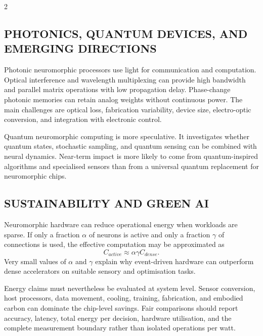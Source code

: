 \begin{multicols}{2}
  \subsection*{\centering\uppercase{Photonics, Quantum Devices, and Emerging Directions}}
  Photonic neuromorphic processors use light for communication and computation. Optical interference and wavelength multiplexing can provide high bandwidth and parallel matrix operations with low propagation delay. Phase-change photonic memories can retain analog weights without continuous power. The main challenges are optical loss, fabrication variability, device size, electro-optic conversion, and integration with electronic control.

  \noindent
  Quantum neuromorphic computing is more speculative. It investigates whether quantum states, stochastic sampling, and quantum sensing can be combined with neural dynamics. Near-term impact is more likely to come from quantum-inspired algorithms and specialised sensors than from a universal quantum replacement for neuromorphic chips.

  \subsection*{\centering\uppercase{Sustainability and Green AI}}
  Neuromorphic hardware can reduce operational energy when workloads are sparse. If only a fraction $\alpha$ of neurons is active and only a fraction $\gamma$ of connections is used, the effective computation may be approximated as
  \[
    C_{active}\approx\alpha\gamma C_{dense}.
  \]
  Very small values of $\alpha$ and $\gamma$ explain why event-driven hardware can outperform dense accelerators on suitable sensory and optimisation tasks.

  \noindent
  Energy claims must nevertheless be evaluated at system level. Sensor conversion, host processors, data movement, cooling, training, fabrication, and embodied carbon can dominate the chip-level savings. Fair comparisons should report accuracy, latency, total energy per decision, hardware utilisation, and the complete measurement boundary rather than isolated operations per watt.


\end{multicols}
